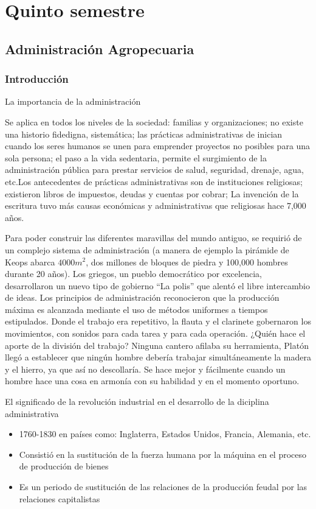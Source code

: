 \part{Quinto semestre}
\chapter{Administración Agropecuaria}
\section{Introducción}
La importancia de la administración 

Se aplica en todos los niveles de la sociedad: familias y organizaciones; no existe una historio fidedigna, sistemática; las prácticas administrativas de inician cuando los seres humanos se unen para emprender proyectos no posibles para una sola persona; el paso a la vida sedentaria, permite el surgimiento de la administración pública para prestar servicios de salud, seguridad, drenaje, agua, etc.Los antecedentes de prácticas administrativas son de instituciones religiosas; existieron libros de impuestos, deudas y cuentas por cobrar; La invención de la escritura tuvo más causas económicas y administrativas que religiosas hace 7,000 años.

Para poder construir las diferentes maravillas del mundo antiguo, se requirió de un complejo sistema de administración (a manera de ejemplo la pirámide de Keops abarca $4000m^2$, dos millones de bloques de piedra y 100,000 hombres durante 20 años). Los griegos, un pueblo democrático por excelencia, desarrollaron un nuevo tipo de gobierno ``La polis'' que alentó el libre intercambio de ideas. Los principios de administración reconocieron que la producción máxima es alcanzada mediante el uso de métodos uniformes a tiempos estipulados. Donde el trabajo era repetitivo, la flauta y el clarinete gobernaron los movimientos, con sonidos para cada tarea y para cada operación. ¿Quién hace el aporte de la división del trabajo? Ninguna cantero afilaba su herramienta, Platón llegó a establecer que ningún hombre debería trabajar simultáneamente la madera y el hierro, ya que así no descollaría. Se hace mejor y fácilmente cuando un hombre hace una cosa en armonía con su habilidad y en el momento oportuno.\cite{taylor1973principios}

El significado de la revolución industrial en el desarrollo de la diciplina administrativa
\begin{itemize}
    \item 1760-1830 en países como: Inglaterra, Estados Unidos, Francia, Alemania, etc.
    \item Consistió en la sustitución de la fuerza humana por la máquina en el proceso de producción de bienes 
    \item Es un periodo de sustitución de las relaciones de la producción feudal por las relaciones capitalistas
\end{itemize}

